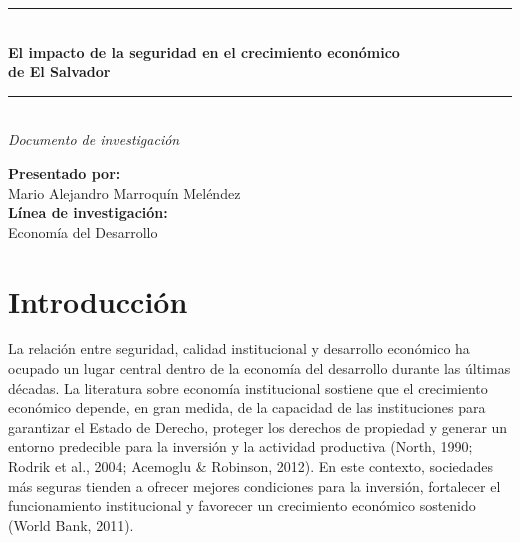 \documentclass[11pt,a4paper]{article}
\begin{document}
\begin{titlepage}
\vspace*{5cm}

\begin{center}
    \begin{tcolorbox}[
        enhanced,
        colback=white,
        colframe=azuloscuro,
        width=0.9\textwidth,
        arc=4mm,
        boxrule=1.5pt,
        drop shadow=azuloscuro!30!white, %
        borderline={0.5pt}{3pt}{dorado}, %
        left=20pt,
        right=20pt,
        top=20pt,
        bottom=20pt
    ]
        \centering
        {\color{dorado}\rule{0.6\textwidth}{1pt}}\\[0.6cm]
        {\Huge\bfseries\color{azuloscuro} El impacto de la seguridad
        en el crecimiento económico\\[0.6cm]
        de El Salvador}\\[0.6cm]
        {\color{dorado}\rule{0.6\textwidth}{1pt}}\\[0.4cm]
        {\Large\itshape\color{azulmedio} Documento de investigación}
    \end{tcolorbox}
\end{center}



\begin{center}
    \vspace{2cm}
    {\large\bfseries\color{azuloscuro} Presentado por:}\\[0.15cm]
    {\Large Mario Alejandro Marroquín Meléndez}\\[0.8cm]

    {\large\bfseries\color{azuloscuro} Línea de investigación:}\\[0.15cm]
    {\large Economía del Desarrollo}
\end{center}

\vspace*{2.5cm}

\end{titlepage}
% 

\section*{Introducción}

La relación entre seguridad, calidad institucional y desarrollo económico ha ocupado un lugar central dentro de la economía del desarrollo durante las últimas décadas. La literatura sobre economía institucional sostiene que el crecimiento económico depende, en gran medida, de la capacidad de las instituciones para garantizar el Estado de Derecho, proteger los derechos de propiedad y generar un entorno predecible para la inversión y la actividad productiva (North, 1990; Rodrik et al., 2004; Acemoglu \& Robinson, 2012). En este contexto, sociedades más seguras tienden a ofrecer mejores condiciones para la inversión, fortalecer el funcionamiento institucional y favorecer un crecimiento económico sostenido (World Bank, 2011).
\end{document}
